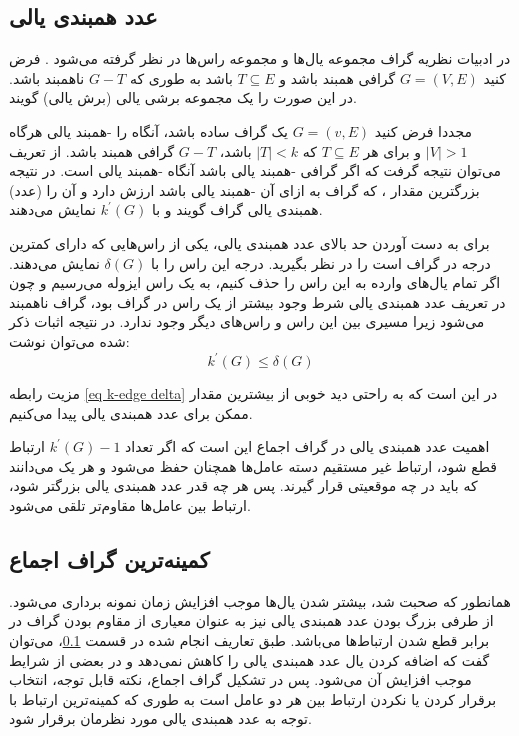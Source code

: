 \subsection{عدد همبندی یالی}\label{se edge connectivity}

 در ادبیات نظریه گراف  مجموعه یال‌ها و  مجموعه راس‌ها در نظر گرفته می‌شود \cite{diestel2005graph, bondy1976graph, west2001introduction}. فرض کنید
$ G = (V,E)$
  گرافی همبند باشد و 
$T \subseteq E$
باشد به طوری که 
$G - T$
ناهمبند باشد. در این صورت  را یک مجموعه برشی یالی (برش یالی) گویند.

مجددا فرض کنید 
$ G = (v,E)$
یک گراف ساده باشد، آنگاه  را -همبند یالی هرگاه 
$|V| > 1$
 و برای هر 
$T \subseteq E$
 که 
$|T| < k$
 باشد، 
$G - T$
گرافی همبند باشد. از تعریف می‌توان نتیجه گرفت که اگر گرافی -همبند یالی باشد آنگاه -همبند یالی است. در نتیجه بزرگترین مقدار ، که گراف  به ازای آن -همبند یالی باشد ارزش دارد و آن را (عدد) همبندی یالی گراف  گویند و با 
$k^\prime(G)$
نمایش می‌دهند.          

برای به دست آوردن حد بالای عدد همبندی یالی، یکی از راس‌هایی که دارای کمترین درجه در گراف است را در نظر بگیرید. درجه این راس را با 
$\delta(G)$
نمایش می‌دهند. اگر تمام یال‌های وارده به این راس را حذف کنیم، به یک راس ایزوله می‌رسیم و چون در تعریف عدد همبندی یالی شرط وجود بیشتر از یک راس در گراف بود، گراف ناهمبند می‌شود زیرا مسیری بین این راس و راس‌های دیگر وجود ندارد. در نتیجه اثبات ذکر شده می‌توان نوشت:
\begin{equation}\label{eq k-edge delta}
k^\prime(G) \leq \delta(G)
\end{equation}

مزیت رابطه \ref{eq k-edge delta} در این است که به راحتی دید خوبی از بیشترین مقدار ممکن برای عدد همبندی یالی پیدا می‌کنیم.

اهمیت عدد همبندی یالی در گراف اجماع این است که اگر تعداد 
$k^\prime(G) - 1$
 ارتباط قطع شود، ارتباط غیر مستقیم دسته عامل‌ها همچنان حفظ می‌شود و هر یک می‌دانند که باید در چه موقعیتی قرار گیرند. پس هر چه قدر عدد همبندی یالی بزرگتر شود، ارتباط بین عامل‌ها مقاوم‌تر تلقی می‌شود.

\subsection{کمینه‌ترین گراف اجماع}\label{sec least formation graph}

همانطور که صحبت شد، بیشتر شدن یال‌ها موجب افزایش زمان نمونه برداری می‌شود. از طرفی بزرگ بودن عدد همبندی یالی نیز به عنوان معیاری از مقاوم بودن گراف در برابر قطع شدن ارتباط‌ها می‌باشد. طبق تعاریف انجام شده در قسمت \ref{se edge connectivity}، می‌توان گفت که اضافه کردن یال عدد همبندی یالی را کاهش نمی‌دهد و در بعضی از شرایط موجب افزایش آن می‌شود. پس در تشکیل گراف اجماع، نکته قابل توجه، انتخاب برقرار کردن یا نکردن ارتباط بین هر دو عامل است به طوری که کمینه‌ترین ارتباط با توجه به عدد همبندی یالی مورد نظرمان برقرار شود.

